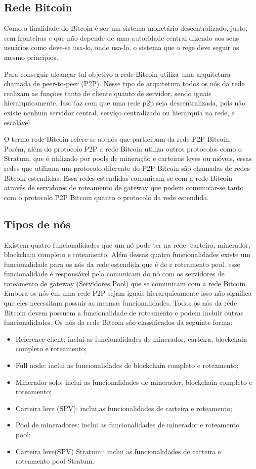 \documentclass[conference,compsoc]{IEEEtran}
\begin{document}
\subsection{Rede Bitcoin}
Como a finalidade do Bitcoin é ser um sistema monetário descentralizado, justo, sem fronteiras e que não depende de uma autoridade central dizendo aos seus usuários como deve-se usa-lo, onde usa-lo, o sistema que o rege deve seguir os mesmo princípios.

Para conseguir alcançar tal objetivo a rede Bitcoin utiliza uma arquitetura chamada de peer-to-peer (P2P). Nesse tipo de arquitetura todos os nós da rede realizam as funções tanto de cliente quanto de servidor, sendo iguais hierarquicamente. Isso faz com que uma rede p2p seja descentralizada, pois não existe nenhum servidor central, serviço centralizado ou hierarquia na rede, e escalável.

O termo rede Bitcoin refere-se ao nós que participam da rede P2P Bitcoin. Porém, além do protocolo P2P a rede Bitcoin utiliza outros protocolos como o Stratum, que é utilizado por pools de mineração e carteiras leves ou móveis, essas redes que utilizam um protocolo diferente do P2P Bitcoin são chamadas de redes Bitcoin estendidas. Essa redes estendidas comunicam-se com a rede Bitcoin através de servidores de roteamento de gateway que podem comunicar-se tanto com o protocolo P2P Bitcoin quanto o protocolo da rede estendida.

\subsection*{Tipos de nós}
\label{section:Tipos de nós}
Existem quatro funcionalidades que um nó pode ter na rede: carteira, minerador, blockchain completo e roteamento. Além dessas quatro funcionalidades existe um funcionalidade para os nós da rede estendida que é de e roteamento pool, esse funcionalidade é responsável pela comunicam do nó com os servidores de roteamento de gateway (Servidores Pool) que se comunicam com a rede Bitcoin. Embora os nós em uma rede P2P sejam iguais hierarquicamente isso não significa que eles necessitam possuir as mesmas funcionalidades. Todos os nós da rede Bitcoin devem possuem a funcionalidade de roteamento e podem incluir outras funcionalidades. Os nós da rede Bitcoin são classificados da seguinte forma:

\begin{itemize}
\item Reference client: inclui as funcionalidades de minerador, carteira, blockchain completo e roteamento;
\item Full node: inclui as funcionalidades de blockchain completo e roteamento;
\item Minerador solo: inclui as funcionalidades de minerador, blockchain completo  e roteamento;
\item Carteira leve (SPV): inclui as funcionalidades de carteira e roteamento;
\item Pool de mineradores: inclui as funcionalidades de minerador e  roteamento pool;
\item Carteira leve(SPV) Stratum:: inclui as funcionalidades de carteira e roteamento pool Stratum.
\end{itemize}
\end{document}
